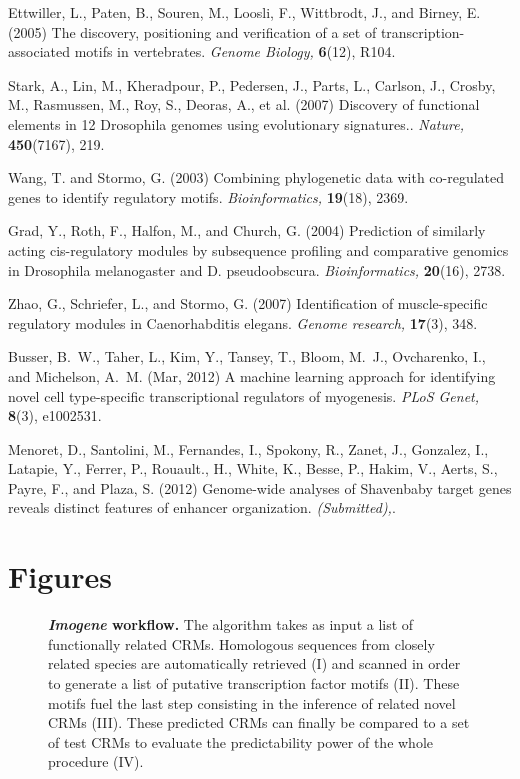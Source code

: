 \documentclass[a4,center,fleqn]{NAR}
\begin{document}
\begin{thebibliography}{10}
Ettwiller, L., Paten, B., Souren, M., Loosli, F., Wittbrodt, J., and Birney, E.
  (2005)
{The discovery, positioning and verification of a set of
  transcription-associated motifs in vertebrates}.
{\em Genome Biology,} {\bf 6}(12), R104.

Stark, A., Lin, M., Kheradpour, P., Pedersen, J., Parts, L., Carlson, J.,
  Crosby, M., Rasmussen, M., Roy, S., Deoras, A., et al. (2007)
{Discovery of functional elements in 12 Drosophila genomes using evolutionary
  signatures.}.
{\em Nature,} {\bf 450}(7167), 219.

Wang, T. and Stormo, G. (2003)
{Combining phylogenetic data with co-regulated genes to identify regulatory
  motifs}.
{\em Bioinformatics,} {\bf 19}(18), 2369.

Grad, Y., Roth, F., Halfon, M., and Church, G. (2004)
{Prediction of similarly acting cis-regulatory modules by subsequence profiling
  and comparative genomics in Drosophila melanogaster and D. pseudoobscura}.
{\em Bioinformatics,} {\bf 20}(16), 2738.

Zhao, G., Schriefer, L., and Stormo, G. (2007)
{Identification of muscle-specific regulatory modules in Caenorhabditis
  elegans}.
{\em Genome research,} {\bf 17}(3), 348.

Busser, B.~W., Taher, L., Kim, Y., Tansey, T., Bloom, M.~J., Ovcharenko, I.,
  and Michelson, A.~M. (Mar, 2012)
A machine learning approach for identifying novel cell type-specific
  transcriptional regulators of myogenesis.
{\em PLoS Genet,} {\bf 8}(3), e1002531.

Menoret, D., Santolini, M., Fernandes, I., Spokony, R., Zanet, J., Gonzalez,
  I., Latapie, Y., Ferrer, P., Rouault., H., White, K., Besse, P., Hakim, V.,
  Aerts, S., Payre, F., and Plaza, S. (2012)
{Genome-wide analyses of Shavenbaby target genes reveals distinct features of
  enhancer organization}.
{\em (Submitted),}.

\end{thebibliography}
  \newpage
  \section*{Figures}

\begin{figure}[!htbp]
\begin{center}
\end{center}
\caption{
{\bf {\em Imogene} workflow.}
    The algorithm takes as input a list of functionally related CRMs.
    Homologous sequences from closely related species are automatically
    retrieved (I) and scanned in order to generate a list of putative
    transcription factor motifs (II).
    These motifs fuel the last step consisting in the inference of related
    novel CRMs (III).
    These predicted CRMs can finally be compared to a set of test CRMs to
    evaluate the predictability power  of the whole procedure (IV). 
    }
    \label{fig:workflow}
\end{figure}
\end{document}
